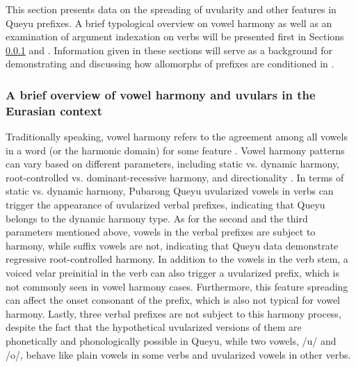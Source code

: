 \documentclass[output=paper]{langscibook}
\begin{document}
This section presents data on the spreading of uvularity and other features in Queyu prefixes. A brief typological overview on vowel harmony as well as an examination of argument indexation on verbs will be presented first in Sections \ref{sec:guan:2.3.1} and . Information given in these sections will serve as a background for demonstrating and discussing how allomorphs of prefixes are conditioned in .

\subsubsection{A brief overview of vowel harmony and uvulars in the Eurasian context}\label{sec:guan:2.3.1}


Traditionally speaking, vowel harmony refers to the agreement among all vowels in a word (or the harmonic domain) for some feature \citep{Hulst2016}. Vowel harmony patterns can vary based on different parameters, including static vs. dynamic harmony, root-controlled vs. dominant-recessive harmony, and directionality \citep{Makeeva_and_Kuznetsova_2022}. In terms of static vs. dynamic harmony, Pubarong Queyu uvularized vowels in verbs can trigger the appearance of uvularized verbal prefixes, indicating that Queyu belongs to the dynamic harmony type. As for the second and the third parameters mentioned above, vowels in the verbal prefixes are subject to harmony, while suffix vowels are not, indicating that Queyu data demonstrate regressive root-controlled harmony. In addition to the vowels in the verb stem, a voiced velar preinitial in the verb can also trigger a uvularized prefix, which is not commonly seen in vowel harmony cases. Furthermore, this feature spreading can affect the onset consonant of the prefix, which is also not typical for vowel harmony. Lastly, three verbal prefixes are not subject to this harmony process, despite the fact that the hypothetical uvularized versions of them are phonetically and phonologically possible in Queyu, while two vowels, /u/ and /o/, behave like plain vowels in some verbs and uvularized vowels in other verbs.  
\end{document}
